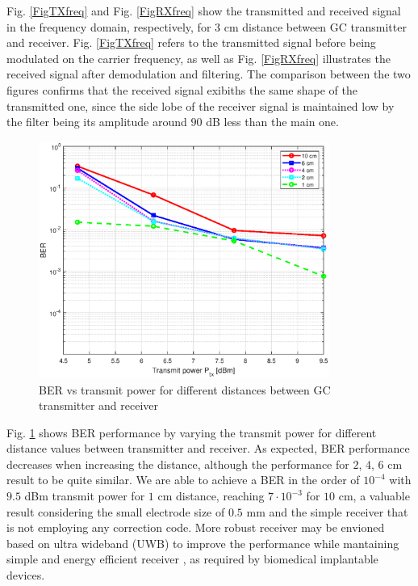 Fig. \ref{FigTXfreq} and Fig. \ref{FigRXfreq} show the transmitted and received signal in the frequency domain, respectively, for $3$ cm distance between GC transmitter and receiver. Fig. \ref{FigTXfreq} refers to the transmitted signal before being modulated on the carrier frequency, as well as Fig. \ref{FigRXfreq} illustrates the received signal after demodulation and filtering. The comparison between the two figures confirms that the received signal exibiths the same shape of the transmitted one, since the side lobe of the receiver signal is maintained low by the filter being its amplitude around $90$ dB less than the main one. 

\begin{figure}
	\includegraphics[width=0.85\textwidth]{figures/GC_testbed/BER_TXpower}
	\caption{BER vs transmit power for different distances between GC transmitter and receiver} \label{FigBER}
\end{figure}

Fig. \ref{FigBER} shows BER performance by varying the transmit power for different distance values between transmitter and receiver. As expected, BER performance decreases when increasing the distance, although the performance for $2$, $4$, $6$ cm result to be quite similar. We are able to achieve a BER in the order of $10^{-4}$ with $9.5$ dBm transmit power for $1$ cm distance, reaching $7 \cdot 10^{-3}$ for $10$ cm, a valuable result considering the small electrode size of $0.5$ mm and the simple receiver that is not employing any correction code. More robust receiver may be envioned based on ultra wideband (UWB) to improve the performance while mantaining simple and energy efficient receiver \cite{Alesii2015}, as required by biomedical implantable devices.    


